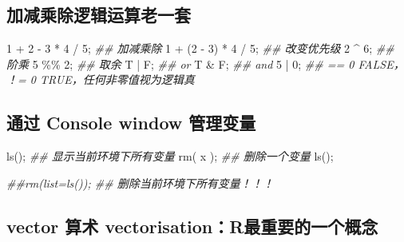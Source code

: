 \documentclass[
]{article}
\newenvironment{Shaded}{}{}
\newcommand{\DecValTok}[1]{\textcolor[rgb]{0.25,0.63,0.44}{#1}}
\newcommand{\DocumentationTok}[1]{\textcolor[rgb]{0.73,0.13,0.13}{\textit{#1}}}
\newcommand{\FunctionTok}[1]{\textcolor[rgb]{0.02,0.16,0.49}{#1}}
\newcommand{\NormalTok}[1]{#1}
\newcommand{\SpecialCharTok}[1]{\textcolor[rgb]{0.25,0.44,0.63}{#1}}
\begin{document}
\hypertarget{ux52a0ux51cfux4e58ux9664ux903bux8f91ux8fd0ux7b97ux8001ux4e00ux5957}{%
\subsection{\texorpdfstring{\textbf{加减乘除逻辑运算}老一套}{加减乘除逻辑运算老一套}}\label{ux52a0ux51cfux4e58ux9664ux903bux8f91ux8fd0ux7b97ux8001ux4e00ux5957}}

\begin{Shaded}
\begin{Highlighting}[]
\DecValTok{1} \SpecialCharTok{+} \DecValTok{2} \SpecialCharTok{{-}} \DecValTok{3} \SpecialCharTok{*} \DecValTok{4} \SpecialCharTok{/} \DecValTok{5}\NormalTok{; }\DocumentationTok{\#\# 加减乘除}
\DecValTok{1} \SpecialCharTok{+}\NormalTok{ (}\DecValTok{2} \SpecialCharTok{{-}} \DecValTok{3}\NormalTok{) }\SpecialCharTok{*} \DecValTok{4} \SpecialCharTok{/} \DecValTok{5}\NormalTok{;  }\DocumentationTok{\#\#  改变优先级}
\DecValTok{2} \SpecialCharTok{\^{}} \DecValTok{6}\NormalTok{; }\DocumentationTok{\#\# 阶乘}
\DecValTok{5} \SpecialCharTok{\%\%} \DecValTok{2}\NormalTok{; }\DocumentationTok{\#\# 取余}
\NormalTok{T }\SpecialCharTok{|}\NormalTok{ F; }\DocumentationTok{\#\# or }
\NormalTok{T }\SpecialCharTok{\&}\NormalTok{ F; }\DocumentationTok{\#\# and}
\DecValTok{5} \SpecialCharTok{|} \DecValTok{0}\NormalTok{; }\DocumentationTok{\#\# == 0 FALSE， ！= 0 TRUE，任何非零值视为逻辑真}
\end{Highlighting}
\end{Shaded}

\hypertarget{ux901aux8fc7-console-window-ux7ba1ux7406ux53d8ux91cf}{%
\subsection{通过 Console window
管理变量}\label{ux901aux8fc7-console-window-ux7ba1ux7406ux53d8ux91cf}}

\begin{Shaded}
\begin{Highlighting}[]
\FunctionTok{ls}\NormalTok{();  }\DocumentationTok{\#\# 显示当前环境下所有变量}
\FunctionTok{rm}\NormalTok{( x ); }\DocumentationTok{\#\# 删除一个变量}
\FunctionTok{ls}\NormalTok{(); }

\DocumentationTok{\#\#rm(list=ls()); \#\# 删除当前环境下所有变量！！！ }
\end{Highlighting}
\end{Shaded}

\hypertarget{vector-ux7b97ux672f-vectorisationrux6700ux91cdux8981ux7684ux4e00ux4e2aux6982ux5ff5}{%
\subsection{\texorpdfstring{vector 算术
\textbf{vectorisation}：R最重要的一个概念}{vector 算术 vectorisation：R最重要的一个概念}}\label{vector-ux7b97ux672f-vectorisationrux6700ux91cdux8981ux7684ux4e00ux4e2aux6982ux5ff5}}
\end{document}
